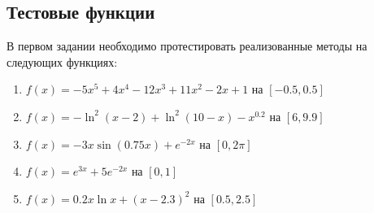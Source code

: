 \documentclass[a4paper,12pt]{article}
\begin{document}
\subsection{Тестовые функции}
В первом задании необходимо протестировать реализованные методы на следующих функциях:
\begin{enumerate}
    \item $f(x) = -5x^5 + 4x^4 - 12x^3 + 11x^2 - 2x + 1$ на $[-0.5, 0.5]$
    \item $f(x) = -\ln^2(x-2) + \ln^2(10-x) - x^{0.2}$ на $[6, 9.9]$
    \item $f(x) = -3x \sin(0.75x) + e^{-2x}$ на $[0, 2\pi]$
    \item $f(x) = e^{3x} + 5e^{-2x}$ на $[0, 1]$
    \item $f(x) = 0.2x \ln x + (x-2.3)^2$ на $[0.5, 2.5]$
\end{enumerate}
\end{document}
